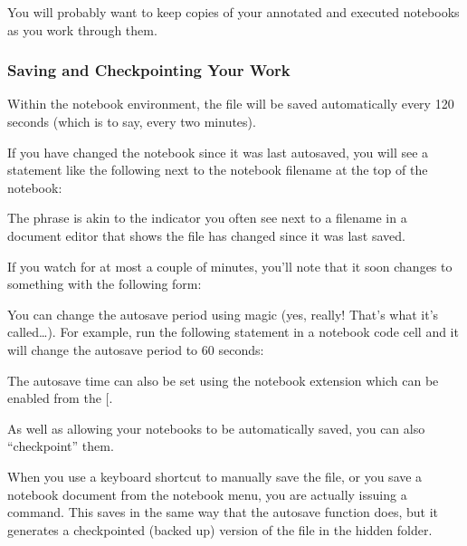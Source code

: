 \documentclass[letterpaper,10pt,english]{sphinxmanual}
\begin{document}
You will probably want to keep copies of your annotated and executed notebooks as you work through them.


\subsubsection{Saving and Checkpointing Your Work}
\label{\detokenize{content/00_READ_ME_FIRST/Section_00_05_Accessing_RoboLab:Saving-and-Checkpointing-Your-Work}}
Within the notebook environment, the file will be saved automatically every 120 seconds (which is to say, every two minutes).

If you have changed the notebook since it was last autosaved, you will see a statement like the following next to the notebook filename at the top of the notebook:


The  phrase is akin to the \sphinxcode{\sphinxupquote{*}} indicator you often see next to a filename in a document editor that shows the file has changed since it was last saved.

If you watch for at most a couple of minutes, you’ll note that it soon changes to something with the following form:


You can change the autosave period using magic (yes, really! That’s what it’s called…). For example, run the following statement in a notebook code cell and it will change the autosave period  to 60 seconds:


The autosave time can also be set using the  notebook extension which can be enabled from the  {[}\sphinxhref{/nbextensions/?nbextension=autosavetime/main}{direct link}{]}.

As well as allowing your notebooks to be automatically saved, you can also “checkpoint” them.

When you use a keyboard shortcut to manually save the file, or you save a notebook document from the notebook  menu, you are actually issuing a  command. This saves in the same way that the autosave function does, but it  generates a checkpointed (backed up) version of the file in the hidden  folder.
\end{document}
